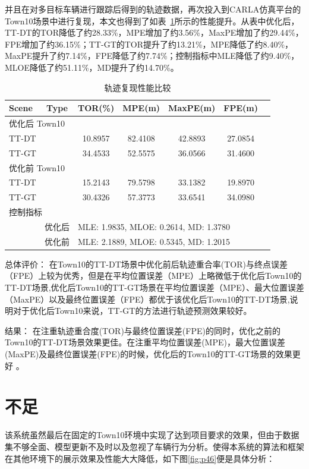 并且在对多目标车辆进行跟踪后得到的轨迹数据，再次投入到CARLA仿真平台的Town10场景中进行复现，本文也得到了如表~\ref{tab:trajectory_comparison}所示的性能提升。从表中优化后，TT-DT的TOR降低了约28.33\%，MPE增加了约3.56\%，MaxPE增加了约29.44\%，FPE增加了约36.15\%；TT-GT的TOR提升了约13.21\%，MPE降低了约8.40\%，MaxPE提升了约7.14\%，FPE降低了约7.74\%；控制指标中MLE降低了约9.40\%，MLOE降低了约51.11\%，MD提升了约14.70\%。


\begin{table}[htbp]
	\centering
	\caption{轨迹复现性能比较}
	\label{tab:trajectory_comparison}
	\begin{tabular}{@{}lcccccc@{}}
		\toprule
		Scene & Type & TOR(\%) & MPE(m) & MaxPE(m) & FPE(m) \\
		\midrule
		\multicolumn{2}{l}{优化后 Town10} \\
		\quad TT-DT &  & 10.8957 & 82.4108 & 42.8893 & 27.0854 \\
		\quad TT-GT &  & 34.4533 & 52.5575 & 36.0566 & 31.4600 \\
		\midrule
		\multicolumn{2}{l}{优化前 Town10} \\
		\quad TT-DT &  & 15.2143 & 79.5798 & 33.1382 & 19.8970 \\
		\quad TT-GT &  & 30.4326 & 57.3773 & 33.6541 & 34.0980 \\
		\midrule
		\multicolumn{2}{l}{控制指标} \\
		& 优化后 & \multicolumn{4}{l}{MLE: 1.9835, MLOE: 0.2614, MD: 1.3780} \\
		& 优化前 & \multicolumn{4}{l}{MLE: 2.1889, MLOE: 0.5345, MD: 1.2015} \\
		\bottomrule
	\end{tabular}
\end{table}



总体评价：
在Town10的TT-DT场景中优化前后轨迹重合率(TOR)与终点误差（FPE）上较为优秀，但是在平均位置误差（MPE）上略微低于优化后Town10的TT-DT场景,优化后Town10的TT-GT场景在平均位置误差（MPE）、最大位置误差（MaxPE）以及最终位置误差（FPE）都优于该优化后Town10的TT-DT场景,说明对于优化后Town10来说，TT-GT的方法进行轨迹预测效果较好。

结果：
在注重轨迹重合度(TOR)与最终位置误差(FPE)的同时，优化之前的Town10的TT-DT场景效果更佳。在注重平均位置误差(MPE)，最大位置误差(MaxPE)及最终位置误差(FPE)的时候，优化后的Town10的TT-GT场景的效果更好 。



\section{不足}
该系统虽然最后在固定的Town10环境中实现了达到项目要求的效果，但由于数据集不够全面、模型更新不及时以及忽视了车辆行为分析。使得本系统的算法和框架在其他环境下的展示效果及性能大大降低，如下图\ref{fig:p46}便是具体分析：




